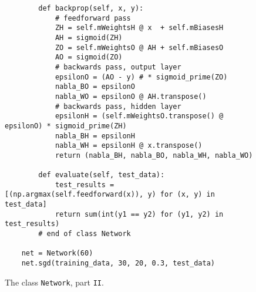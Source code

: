 \begin{figure}[!ht]
\centering
\begin{verbatim}
        def backprop(self, x, y):
            # feedforward pass
            ZH = self.mWeightsH @ x  + self.mBiasesH
            AH = sigmoid(ZH)
            ZO = self.mWeightsO @ AH + self.mBiasesO
            AO = sigmoid(ZO)
            # backwards pass, output layer
            epsilonO = (AO - y) # * sigmoid_prime(ZO)
            nabla_BO = epsilonO
            nabla_WO = epsilonO @ AH.transpose()
            # backwards pass, hidden layer
            epsilonH = (self.mWeightsO.transpose() @ epsilonO) * sigmoid_prime(ZH)
            nabla_BH = epsilonH
            nabla_WH = epsilonH @ x.transpose()
            return (nabla_BH, nabla_BO, nabla_WH, nabla_WO)
        
        def evaluate(self, test_data):
            test_results = [(np.argmax(self.feedforward(x)), y) for (x, y) in test_data]
            return sum(int(y1 == y2) for (y1, y2) in test_results)
        # end of class Network
            
    net = Network(60)
    net.sgd(training_data, 30, 20, 0.3, test_data)   
\end{verbatim}
\vspace*{-0.3cm}
\caption{The class \texttt{Network}, part \texttt{II}.}
\label{fig:Digit-Regocnition.ipynb-4}
\end{figure}


